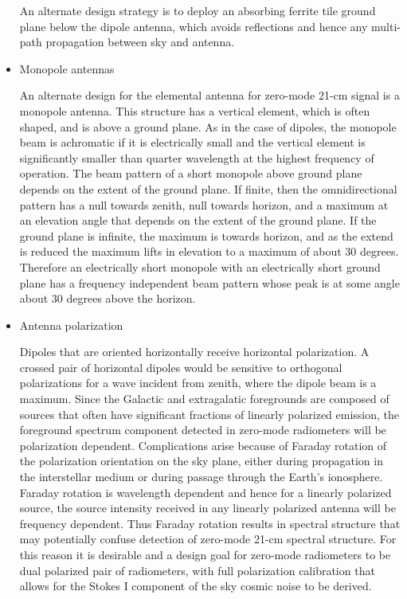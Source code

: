 \begin{itemize}
   An alternate design strategy is to deploy an absorbing ferrite tile ground plane below the dipole antenna, which avoids reflections and hence any multi-path propagation between sky and antenna. 
   
   \item
   Monopole antennas
   
   An alternate design for the elemental antenna for zero-mode 21-cm signal is a monopole antenna.  This structure has a vertical element, which is often shaped, and is above a ground plane.  As in the case of dipoles, the monopole beam is achromatic if it is electrically small and the vertical element is significantly smaller than quarter wavelength at the highest frequency of operation.  The beam pattern of a short monopole above ground plane depends on the extent of the ground plane. If finite, then the omnidirectional pattern has a null towards zenith, null towards horizon, and a maximum at an elevation angle that depends on the extent of the ground plane.  If the ground plane is infinite, the maximum is towards horizon, and as the extend is reduced the maximum lifts in elevation to a maximum of about 30 degrees.  Therefore an electrically short monopole with an electrically short ground plane has a frequency independent beam pattern whose peak is at some angle about 30 degrees above the horizon.
   
   \item
   Antenna polarization
   
   Dipoles that are oriented horizontally receive horizontal polarization.  A crossed pair of horizontal dipoles would be sensitive to orthogonal polarizations for a wave incident from zenith, where the dipole beam is a maximum.  Since the Galactic and extragalatic foregrounds are composed of sources that often have significant fractions of linearly polarized emission, the foreground spectrum component detected in zero-mode radiometers will be polarization dependent.  Complications arise because of Faraday rotation of the polarization orientation on the sky plane, either during propagation in the interstellar medium or during passage through the Earth's ionosphere.  Faraday rotation is wavelength dependent and hence for a linearly polarized source, the source intensity received in any linearly polarized antenna will be frequency dependent.  Thus Faraday rotation results in spectral structure that may potentially confuse detection of zero-mode 21-cm spectral structure.  For this reason it is desirable and a design goal for zero-mode radiometers to be dual polarized pair of radiometers, with full polarization calibration that allows for the Stokes I component of the sky cosmic noise to be derived.
   

\end{itemize}
